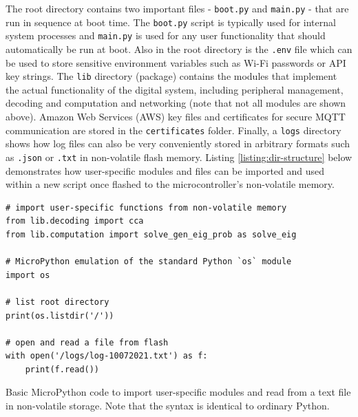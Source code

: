 The root directory contains two important files - \texttt{boot.py} and \texttt{main.py} - that are run in sequence at boot time. The \texttt{boot.py} script is typically used for internal system processes and \texttt{main.py} is used for any user functionality that should automatically be run at boot. Also in the root directory is the \texttt{.env} file which can be used to store sensitive environment variables such as Wi-Fi passwords or API key strings. The \texttt{lib} directory (package) contains the modules that implement the actual functionality of the digital system, including peripheral management, decoding and computation and networking (note that not all modules are shown above). Amazon Web Services (AWS) key files and certificates for secure MQTT communication are stored in the \texttt{certificates} folder. Finally, a \texttt{logs} directory shows how log files can also be very conveniently stored in arbitrary formats such as \texttt{.json} or \texttt{.txt} in non-volatile flash memory. Listing \ref{listing:dir-structure} below demonstrates how user-specific modules and files can be imported and used within a new script once flashed to the microcontroller's non-volatile memory. 

\begin{listing}[h]
\small
\begin{verbatim}
# import user-specific functions from non-volatile memory
from lib.decoding import cca
from lib.computation import solve_gen_eig_prob as solve_eig

# MicroPython emulation of the standard Python `os` module
import os

# list root directory
print(os.listdir('/'))

# open and read a file from flash
with open('/logs/log-10072021.txt') as f:
    print(f.read())
\end{verbatim}
\caption[Basic MicroPython code to import user-specific modules and read from a text file in non-volatile storage.]{Basic MicroPython code to import user-specific modules and read from a text file in non-volatile storage. Note that the syntax is identical to ordinary Python.}
\label{listing:dir-structure}
\end{listing}

